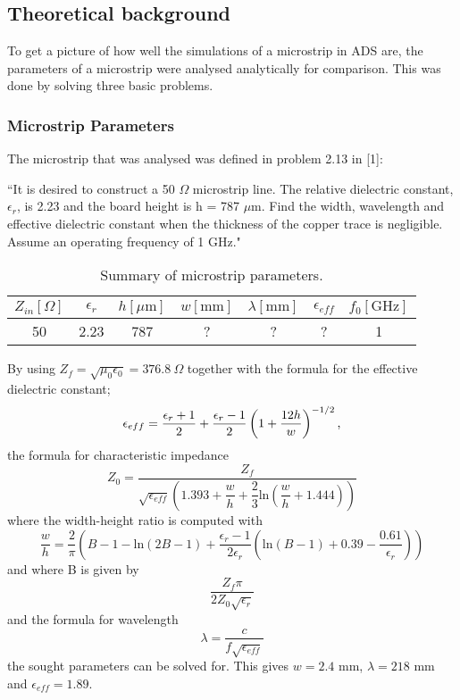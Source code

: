 \documentclass[report.tex]{subfiles}
\begin{document}
\subsection{Theoretical background}\label{sec: Lab1 Theoretical Background}
To get a picture of how well the simulations of a microstrip in ADS are, the parameters of a microstrip  were analysed analytically for comparison. This was done by solving three basic problems.

\subsubsection{Microstrip Parameters}\label{subsubsec: Microstrip_Parameters}
The microstrip that was analysed was defined in problem 2.13 in [1]:

``It is desired to construct a 50 $\Omega$ microstrip line. The relative dielectric constant, $\epsilon_r$, is 2.23 and the board height is h = 787 $\mu \text{m.}$ Find the width, wavelength and effective dielectric constant when the thickness of the copper trace is negligible. Assume an operating frequency of 1 GHz."

\begin{table}[h]
    \centering
    \caption{Summary of microstrip parameters.}
    \begin{tabular}{c | c | c | c | c | c | c}
        $Z_{in} [\Omega]$ & $\epsilon_r $ & $h [\mu \text{m}]$ & $w [\text{mm}]$ & $\lambda [\text{mm}]$ & $\epsilon_{eff}$ & $f_0 [\text{GHz}]$\\
        \hline
         50 & 2.23 & 787 & ? & ? & ? & 1
    \end{tabular}
    \label{table: Lab1 Microstrip parameters}
\end{table}

By using $Z_{f} = \sqrt{\mu_{0} \epsilon_{0}} = 376.8\:\Omega$ together with the formula for the effective dielectric constant;
\begin{equation}
	\epsilon_{eff} = \dfrac{\epsilon_{r} + 1}{2} + \dfrac{\epsilon_{r} - 1}{2} \left(1 + {\dfrac{12 h}{w}} \right)^{-1/2} \text ,
\end{equation}
the formula for characteristic impedance
\begin{equation}
	Z_0 = \dfrac{Z_f}{\sqrt{\epsilon_{eff}}\left(1.393 + \dfrac{w}{h} + \dfrac{2}{3} \text{ln}\left(\dfrac{w}{h} + 1.444 \right)\right)}
\end{equation}
where the width-height ratio is computed with
\begin{equation}
	\dfrac{w}{h} = \dfrac{2}{\pi}\left(B - 1 - \text{ln}\left(2B - 1 \right) + \dfrac{\epsilon_r - 1}{2 \epsilon_r}\left(\text{ln}\left(B -1\right) + 0.39 - \dfrac{0.61}{\epsilon_r}\right)\right)
\end{equation}
and where B is given by
\begin{equation}
\dfrac{Z_f \pi}{2Z_0\sqrt{\epsilon_r}}
\end{equation}
and the formula for wavelength
\begin{equation}
	\lambda = \dfrac{c}{f\sqrt{\epsilon_{eff}}}
\end{equation}
the sought parameters can be solved for. This gives $w = 2.4 \text{ mm}$, $\lambda = 218 \text{ mm}$ and $\epsilon_{eff} = 1.89 \text{.}$
\end{document}
